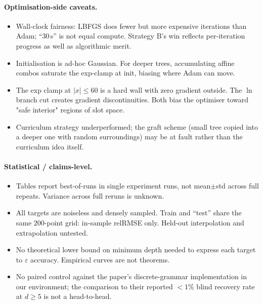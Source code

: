 \documentclass[11pt]{article}
\begin{document}
\paragraph{Optimisation-side caveats.}
\begin{itemize}
\item Wall-clock fairness: LBFGS does fewer but more expensive iterations
  than Adam; ``$30\,$s'' is not equal compute. Strategy B's win
  reflects per-iteration progress as well as algorithmic merit.
\item Initialisation is ad-hoc Gaussian. For deeper trees, accumulating
  affine combos saturate the exp-clamp at init, biasing where Adam can move.
\item The exp clamp at $|x| \leq 60$ is a hard wall with zero gradient
  outside. The $\ln$ branch cut creates gradient discontinuities. Both
  bias the optimiser toward "safe interior" regions of slot space.
\item Curriculum strategy underperformed; the graft scheme (small tree
  copied into a deeper one with random surroundings) may be at fault rather
  than the curriculum idea itself.
\end{itemize}

\paragraph{Statistical / claims-level.}
\begin{itemize}
\item Tables report best-of-runs in single experiment runs, not
  mean$\pm$std across full repeats. Variance across full reruns is unknown.
\item All targets are noiseless and densely sampled. Train and ``test'' share
  the same $200$-point grid: in-sample relRMSE only. Held-out interpolation
  and extrapolation untested.
\item No theoretical lower bound on minimum depth needed to express each
  target to $\varepsilon$ accuracy. Empirical curves are not theorems.
\item No paired control against the paper's discrete-grammar implementation
  in our environment; the comparison to their reported $<1\%$ blind recovery
  rate at $d \geq 5$ is not a head-to-head.
\end{itemize}
\end{document}
